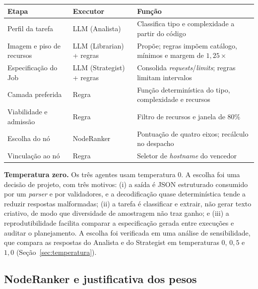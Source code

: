 \documentclass[11pt,a4paper]{article}
\newcommand{\fonte}[1]{\par\vspace{2pt}{\footnotesize Fonte: #1\par}}
\begin{document}
\begin{quadro}[h]
  \caption{Divisão de responsabilidades entre o LLM e as regras determinísticas.}
  \label{qua:papeis}
  \centering\footnotesize
  \setlength{\tabcolsep}{3pt}
  \begin{tabularx}{\linewidth}{|>{\raggedright\arraybackslash}p{2.3cm}|>{\raggedright\arraybackslash}p{1.6cm}|>{\raggedright\arraybackslash}X|}
    \hline
    \textbf{Etapa} & \textbf{Executor} & \textbf{Função}\\ \hline
    Perfil da tarefa & LLM (Analista) & Classifica tipo e complexidade a
      partir do código\\ \hline
    Imagem e piso de recursos & LLM (Librarian) + regras & Propõe; regras
      impõem catálogo, mínimos e margem de $1{,}25\times$\\ \hline
    Especificação do Job & LLM (Strategist) + regras & Consolida
      \textit{requests}/\textit{limits}; regras limitam intervalos\\ \hline
    Camada preferida & Regra & Função determinística do tipo,
      complexidade e recursos\\ \hline
    Viabilidade e admissão & Regra & Filtro de recursos e janela de
      $80\%$\\ \hline
    Escolha do nó & NodeRanker & Pontuação de quatro eixos; recálculo no
      despacho\\ \hline
    Vinculação ao nó & Regra & Seletor de \textit{hostname} do vencedor\\ \hline
  \end{tabularx}
  \fonte{Elaborado pelo autor (2026).}
\end{quadro}

\textbf{Temperatura zero.} Os três agentes usam temperatura $0$. A escolha
foi uma decisão de projeto, com três motivos: (i) a saída é JSON estruturado
consumido por um \textit{parser} e por validadores, e a decodificação
quase determinística tende a reduzir respostas malformadas; (ii) a tarefa é
classificar e extrair, não gerar texto criativo, de modo que diversidade de
amostragem não traz ganho; e (iii) a reprodutibilidade facilita comparar a
especificação gerada entre execuções e auditar o planejamento. A escolha
foi verificada em uma análise de sensibilidade, que compara as
respostas do Analista e do Strategist em temperaturas $0$, $0{,}5$ e $1{,}0$
(Seção~\ref{sec:temperatura}).

\subsection{NodeRanker e justificativa dos pesos}\label{sec:ranker}
\end{document}
